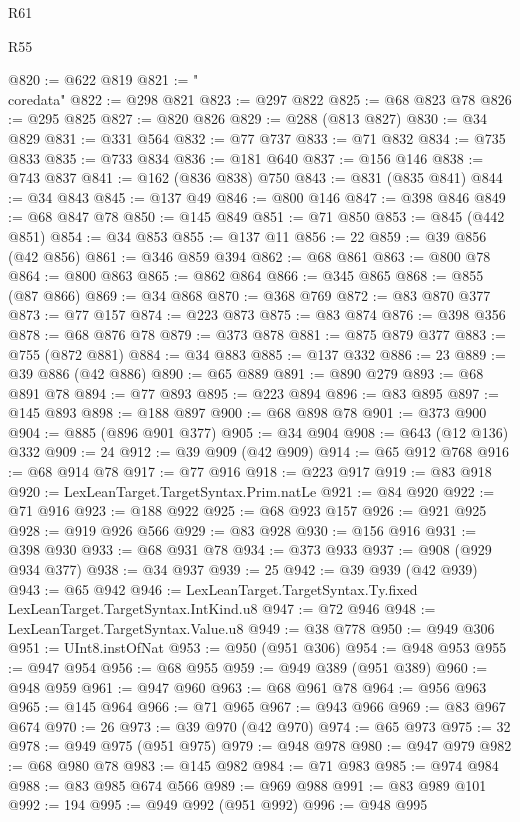 \begin{lexlean}{R61}
\begin{lexlean}{R55}
\begin{coremodule}
{{{{{{{{{{{{{{{{{{{{{{{{{{{{{{{{{{{{{{{{{{{{{{{{{{{{{{{{{{{{{{@820 := @622 @819
@821 := "\\coredata"
@822 := @298 @821
@823 := @297 @822
@825 := @68 @823 @78
@826 := @295 @825
@827 := @820 @826
@829 := @288 (@813 @827)
@830 := @34 @829
@831 := @331 @564
@832 := @77 @737
@833 := @71 @832
@834 := @735 @833
@835 := @733 @834
@836 := @181 @640
@837 := @156 @146
@838 := @743 @837
@841 := @162 (@836 @838) @750
@843 := @831 (@835 @841)
@844 := @34 @843
@845 := @137 @49
@846 := @800 @146
@847 := @398 @846
@849 := @68 @847 @78
@850 := @145 @849
@851 := @71 @850
@853 := @845 (@442 @851)
@854 := @34 @853
@855 := @137 @11
@856 := 22
@859 := @39 @856 (@42 @856)
@861 := @346 @859 @394
@862 := @68 @861
@863 := @800 @78
@864 := @800 @863
@865 := @862 @864
@866 := @345 @865
@868 := @855 (@87 @866)
@869 := @34 @868
@870 := @368 @769
@872 := @83 @870 @377
@873 := @77 @157
@874 := @223 @873
@875 := @83 @874
@876 := @398 @356
@878 := @68 @876 @78
@879 := @373 @878
@881 := @875 @879 @377
@883 := @755 (@872 @881)
@884 := @34 @883
@885 := @137 @332
@886 := 23
@889 := @39 @886 (@42 @886)
@890 := @65 @889
@891 := @890 @279
@893 := @68 @891 @78
@894 := @77 @893
@895 := @223 @894
@896 := @83 @895
@897 := @145 @893
@898 := @188 @897
@900 := @68 @898 @78
@901 := @373 @900
@904 := @885 (@896 @901 @377)
@905 := @34 @904
@908 := @643 (@12 @136) @332
@909 := 24
@912 := @39 @909 (@42 @909)
@914 := @65 @912 @768
@916 := @68 @914 @78
@917 := @77 @916
@918 := @223 @917
@919 := @83 @918
@920 := LexLeanTarget.TargetSyntax.Prim.natLe
@921 := @84 @920
@922 := @71 @916
@923 := @188 @922
@925 := @68 @923 @157
@926 := @921 @925
@928 := @919 @926 @566
@929 := @83 @928
@930 := @156 @916
@931 := @398 @930
@933 := @68 @931 @78
@934 := @373 @933
@937 := @908 (@929 @934 @377)
@938 := @34 @937
@939 := 25
@942 := @39 @939 (@42 @939)
@943 := @65 @942
@946 := LexLeanTarget.TargetSyntax.Ty.fixed LexLeanTarget.TargetSyntax.IntKind.u8
@947 := @72 @946
@948 := LexLeanTarget.TargetSyntax.Value.u8
@949 := @38 @778
@950 := @949 @306
@951 := UInt8.instOfNat
@953 := @950 (@951 @306)
@954 := @948 @953
@955 := @947 @954
@956 := @68 @955
@959 := @949 @389 (@951 @389)
@960 := @948 @959
@961 := @947 @960
@963 := @68 @961 @78
@964 := @956 @963
@965 := @145 @964
@966 := @71 @965
@967 := @943 @966
@969 := @83 @967 @674
@970 := 26
@973 := @39 @970 (@42 @970)
@974 := @65 @973
@975 := 32
@978 := @949 @975 (@951 @975)
@979 := @948 @978
@980 := @947 @979
@982 := @68 @980 @78
@983 := @145 @982
@984 := @71 @983
@985 := @974 @984
@988 := @83 @985 @674 @566
@989 := @969 @988
@991 := @83 @989 @101
@992 := 194
@995 := @949 @992 (@951 @992)
@996 := @948 @995
}}}}}}}}}}}}}}}}}}}}}}}}}}}}}}}}}}}}}}}}}}}}}}}}}}}}}}}}}}}}}}
\end{coremodule}
\end{lexlean}
\end{lexlean}
